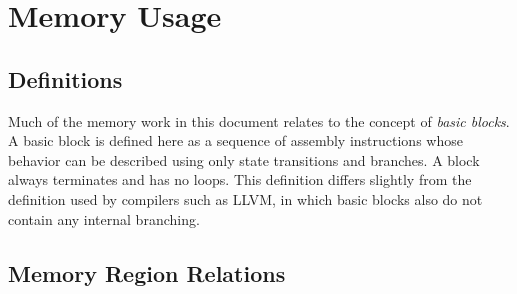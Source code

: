 \chapter{Memory Usage}

\section{Definitions}
Much of the memory work in this document relates to the concept of \emph{basic blocks}.
A basic block is defined here as a sequence of assembly instructions
whose behavior can be described using only state transitions and branches.
A block always terminates and has no loops.
This definition differs slightly from the definition used by compilers such as LLVM,
in which basic blocks also do not contain any internal branching.

\section{Memory Region Relations}
